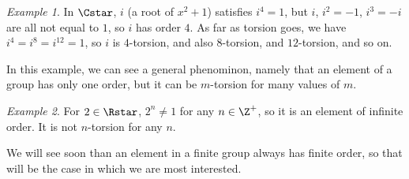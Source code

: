 \documentclass[12pt]{amsart}
\theoremstyle{plain}
\theoremstyle{definition}
\theoremstyle{remark}
\newtheorem*{exam}{Example}
\begin{document}
\begin{exam}
  In $\Cstar$, $i$ (a root of $x^2+1$) satisfies $i^4=1$, but
  $i$, $i^2=-1$, $i^3=-i$ are all not equal to $1$, so $i$ has order $4$.  
  As far as torsion
  goes, we have $i^4=i^8=i^{12}=1$, so $i$ is $4$-torsion, and also 
  $8$-torsion, and $12$-torsion, and so on.
\end{exam}
In this example, we can see a general phenominon, namely that an element
of a group has only one order, but it can be $m$-torsion for many values
of $m$.

\begin{exam}
For $2\in \Rstar$, $2^n\neq 1$ for any $n\in\Z^+$, so it is an element 
of infinite order.  It is not $n$-torsion for any $n$.
\end{exam}

We will see soon than an element in a finite group always has finite order, so that will
be the case in which we are most interested.
\end{document}
